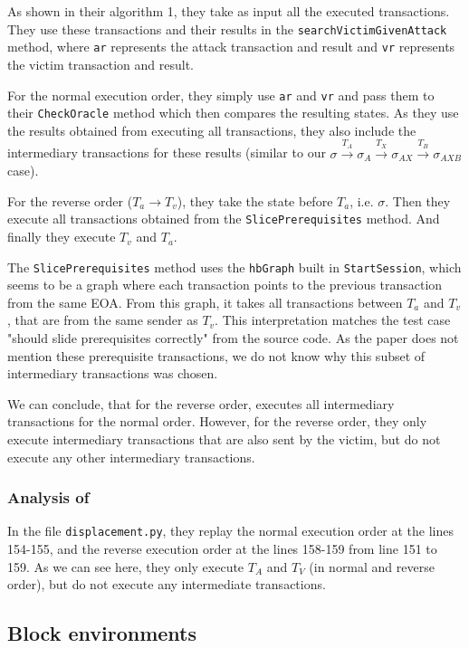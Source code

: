 \documentclass[draft,final]{vutinfth} %
\begin{document}
As shown in their algorithm 1, they take as input all the executed transactions. They use these transactions and their results in the \verb|searchVictimGivenAttack| method, where \verb|ar| represents the attack transaction and result and \verb|vr| represents the victim transaction and result.

For the normal execution order, they simply use \verb|ar| and \verb|vr| and pass them to their \verb|CheckOracle| method which then compares the resulting states. As they use the results obtained from executing all transactions, they also include the intermediary transactions for these results (similar to our $\sigma \xrightarrow{T_A} \sigma_A \xrightarrow{T_X} \sigma_{AX} \xrightarrow{T_B} \sigma_{AXB}$ case).

For the reverse order ($T_a \rightarrow T_v$), they take the state before $T_a$, i.e. $\sigma$. Then they execute all transactions obtained from the \verb|SlicePrerequisites| method. And finally they execute $T_v$ and $T_a$.

The \verb|SlicePrerequisites| method uses the \verb|hbGraph| built in \verb|StartSession|, which seems to be a graph where each transaction points to the previous transaction from the same EOA. From this graph, it takes all transactions between $T_a$ and $T_v$, that are from the same sender as $T_v$. This interpretation matches the test case "should slide prerequisites correctly" from the source code. As the paper does not mention these prerequisite transactions, we do not know why this subset of intermediary transactions was chosen.

We can conclude, that for the reverse order, \cite{zhang_combatting_2023} executes all intermediary transactions for the normal order. However, for the reverse order, they only execute intermediary transactions that are also sent by the victim, but do not execute any other intermediary transactions.

\subsubsection{Analysis of \cite{torres_frontrunner_2021}}

In the file \verb|displacement.py|, they replay the normal execution order at the lines 154-155, and the reverse execution order at the lines 158-159 from line 151 to 159. As we can see here, they only execute $T_A$ and $T_V$ (in normal and reverse order), but do not execute any intermediate transactions.

\subsection{Block environments}
\end{document}

